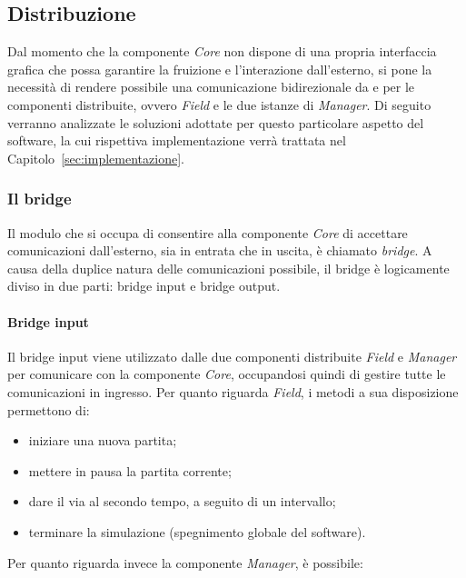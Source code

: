 \subsection{Distribuzione}
\label{sec:analisi_distribuzione}

Dal momento che la componente \textit{Core} non dispone di una propria interfaccia grafica che possa garantire la fruizione e l'interazione dall'esterno, si pone la necessità di rendere possibile una comunicazione bidirezionale da e per le componenti distribuite, ovvero \textit{Field} e le due istanze di \textit{Manager}. Di seguito verranno analizzate le soluzioni adottate per questo particolare aspetto del software, la cui rispettiva implementazione verrà trattata nel Capitolo~\ref{sec:implementazione}.

\subsubsection{Il bridge}
\label{sec:analisi_distribuzione_bridge}

Il modulo che si occupa di consentire alla componente \textit{Core} di accettare comunicazioni dall'esterno, sia in entrata che in uscita, è chiamato \textit{bridge}. A causa della duplice natura delle comunicazioni possibile, il bridge è logicamente diviso in due parti: bridge input e bridge output.

\paragraph{Bridge input}\label{sec:analisi_distribuzione_bridge_input} Il bridge input viene utilizzato dalle due componenti distribuite \textit{Field} e \textit{Manager} per comunicare con la componente \textit{Core}, occupandosi quindi di gestire tutte le comunicazioni in ingresso. Per quanto riguarda \textit{Field}, i metodi a sua disposizione permettono di:

\begin{itemize}
	\item iniziare una nuova partita;
	\item mettere in pausa la partita corrente;
	\item dare il via al secondo tempo, a seguito di un intervallo;
	\item terminare la simulazione (spegnimento globale del software).
\end{itemize}

\noindent Per quanto riguarda invece la componente \textit{Manager}, è possibile:


